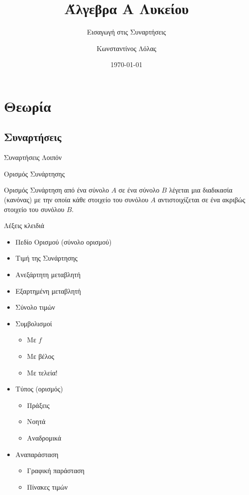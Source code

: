 \documentclass{presentation}
\title{Άλγεβρα Α Λυκείου}
\subtitle{Εισαγωγή στις Συναρτήσεις}
\author[Λόλας]{Κωνσταντίνος Λόλας}
\date{\today}
\begin{document}
\frame{\titlepage}

\section{Θεωρία}
\subsection{Συναρτήσεις}

\begin{frame}{Συναρτήσεις Λοιπόν}

\end{frame}

\begin{frame}{Ορισμός Συνάρτησης}

  \begin{block}{Ορισμός}
    Συνάρτηση από ένα σύνολο $Α$ σε ένα σύνολο $Β$ λέγεται μια διαδικασία (κανόνας) με την οποία κάθε στοιχείο του συνόλου $Α$ αντιστοιχίζεται σε ένα ακριβώς στοιχείο του συνόλου $Β$.
  \end{block}
\end{frame}

\begin{frame}
  Λέξεις κλειδιά
  \begin{itemize}[<+->]
    \item Πεδίο Ορισμού (σύνολο ορισμού)
    \item Τιμή της Συνάρτησης
    \item Ανεξάρτητη μεταβλητή
    \item Εξαρτημένη μεταβλητή
    \item Σύνολο τιμών
    \item Συμβολισμοί
          \begin{itemize}[<+->]
            \item Με $f$
            \item Με βέλος
            \item Με τελεία!
          \end{itemize}
    \item Τύπος (ορισμός)
          \begin{itemize}[<+->]
            \item Πράξεις
            \item Νοητά
            \item Αναδρομικά
          \end{itemize}
    \item Αναπαράσταση
          \begin{itemize}[<+->]
            \item Γραφική παράσταση
            \item Πίνακες τιμών
          \end{itemize}
  \end{itemize}
\end{frame}
\end{document}
